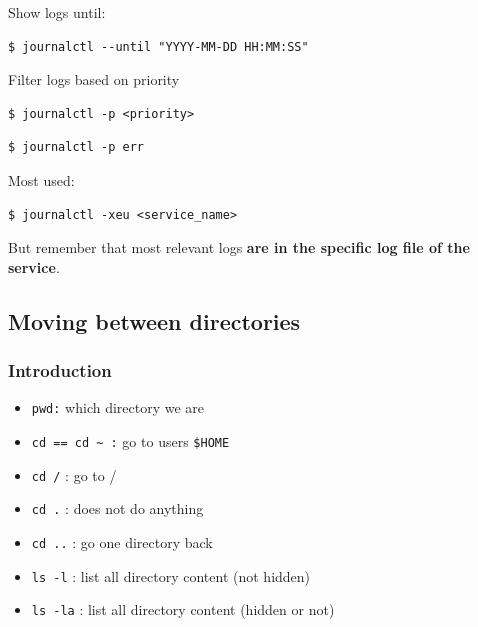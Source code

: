 \documentclass{article}
\newenvironment{blocktemplate}[1]{%
    \tcolorbox[beamer,%
    noparskip,breakable,
    colframe=Blue,%
    colbacklower=LimeGreen!75!LightGreen,%
    title=#1]}%
    {\endtcolorbox}
\newenvironment{codetemplate}[1][]{%
  \mybasecolorbox[#1]
  \itshape
}{%
  \endmybasecolorbox
}
\begin{document}
Show logs until:
\begin{codetemplate}{}
\begin{verbatim}
$ journalctl --until "YYYY-MM-DD HH:MM:SS"
\end{verbatim}
\end{codetemplate}

Filter logs based on priority
\begin{codetemplate}{}
\begin{verbatim}
$ journalctl -p <priority>
\end{verbatim}
\end{codetemplate}
\begin{codetemplate}{}
\begin{verbatim}
$ journalctl -p err
\end{verbatim}
\end{codetemplate}

\begin{blocktemplate}{Note}
Most used:
\begin{codetemplate}{}
\begin{verbatim}
$ journalctl -xeu <service_name>
\end{verbatim}
\end{codetemplate}

But remember that most relevant logs \textbf{are in the specific log file of the service}.
\end{blocktemplate}

\subsection{Moving between directories}
\subsubsection{Introduction}
\begin{itemize}
    \item \verb+pwd:+ which directory we are
    \item \verb+cd == cd ~ :+ go to users \verb+$HOME+
    \item \verb+cd /+ : go to /
    \item \verb+cd .+ : does not do anything
    \item \verb+cd ..+ : go one directory back
    \item \verb+ls -l+ : list all directory content (not hidden)
    \item \verb+ls -la+ : list all directory content (hidden or not)
\end{itemize}
\end{document}
